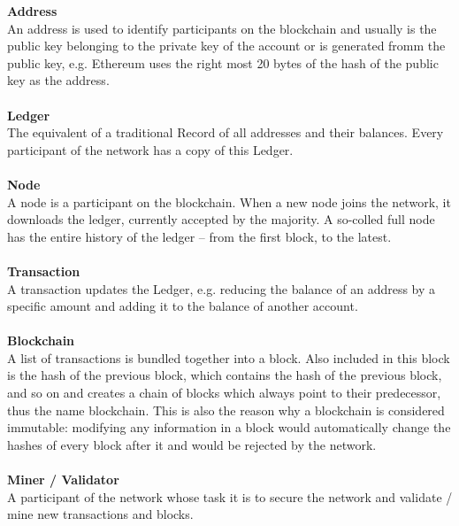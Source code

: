 \textbf{Address}\\
An address is used to identify participants on the blockchain and usually is the public key belonging to the private key of the account or is generated fromm the public key, e.g. Ethereum  uses the right most 20 bytes of the hash of the public key as the address\cite{ethereum-yellow-paper}.
\\\\

\textbf{Ledger}\\
The equivalent of a traditional Record of all addresses and their balances. Every participant of the network has a copy of this Ledger.
\\\\

\textbf{Node}\\
A node is a participant on the blockchain. When a new node joins the network, it downloads the ledger, currently accepted by the majority. A so-colled full node has the entire history of the ledger – from the first block, to the latest.
\\\\

\textbf{Transaction}\\
A transaction updates the Ledger, e.g. reducing the balance of an address by a specific amount and adding it to the balance of another account.
\\\\

\textbf{Blockchain}\\
A list of transactions is bundled together into a block. Also included in this block is the hash of the previous block, which contains the hash of the previous block, and so on and creates a chain of blocks\cite{bitcoin-whitepaper} which always point to their predecessor, thus the name blockchain. This is also the reason why a blockchain is considered immutable: modifying any information in a block would automatically change the hashes of every block after it and would be rejected by the network.
\\\\

\textbf{Miner / Validator}\\
A participant of the network whose task it is to secure the network and validate / mine new transactions and blocks.
\\\\

